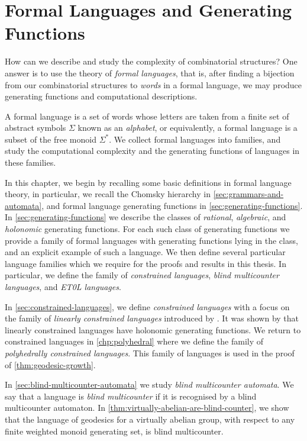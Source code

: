 \chapter{Formal Languages and Generating Functions}\label{chp:formal-language-and-automata}

How can we describe and study the complexity of combinatorial structures?
One answer is to use the theory of \emph{formal languages}, that is, after finding a bijection from our combinatorial structures to \emph{words} in a formal language, we may produce generating functions and computational descriptions. %

A formal language is a set of words whose letters are taken from a finite set of abstract symbols $\Sigma$ known as an \emph{alphabet}, or equivalently, a formal language is a subset of the free monoid $\Sigma^*$.
We collect formal languages into families, and study the computational complexity and the generating functions of languages in these families.

In this chapter, we begin by recalling some basic definitions in formal language theory, in particular, we recall the Chomsky hierarchy in \cref{sec:grammars-and-automata}, and formal language generating functions in \cref{sec:generating-functions}.
In \cref{sec:generating-functions} we describe the classes of \emph{rational}, \emph{algebraic}, and \emph{holonomic} generating functions.
For each such class of generating functions we provide a family of formal languages with generating functions lying in the class, and an explicit example of such a language.
We then define several particular language families which we require for the proofs and results in this thesis.
In particular, we define the family of \emph{constrained languages}, \emph{blind multicounter languages}, and \emph{ET0L languages}.

In \cref{sec:constrained-languages}, we define \emph{constrained languages} with a focus on the family of \emph{linearly constrained languages} introduced by \textcite{massazza1993}.
It was shown by \textcite[Theorem~2]{massazza1993} that linearly constrained languages have holonomic generating functions.
We return to constrained languages in \cref{chp:polyhedral} where we define the family of \emph{polyhedrally constrained languages}.
This family of languages is used in the proof of \cref{thm:geodesic-growth}.

In \cref{sec:blind-multicounter-automata} we study \emph{blind multicounter automata}.
We say that a language is \emph{blind multicounter} if it is recognised by a blind multicounter automaton.
In \cref{thm:virtually-abelian-are-blind-counter}, we show that the language of geodesics for a virtually abelian group, with respect to any finite weighted monoid generating set, is blind multicounter.

